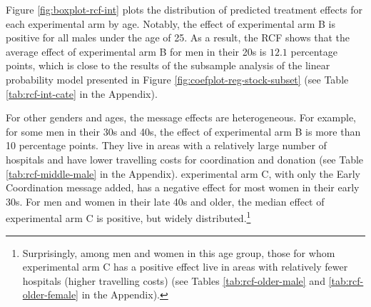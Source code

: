 \documentclass[
]{article}
\begin{document}
Figure \ref{fig:boxplot-rcf-int} plots the distribution of predicted treatment effects for each experimental arm by age. Notably, the effect of experimental arm B is positive for all males under the age of 25. As a result, the RCF shows that the average effect of experimental arm B for men in their 20s is \(12.1\) percentage points, which is close to the results of the subsample analysis of the linear probability model presented in Figure \ref{fig:coefplot-reg-stock-subset} (see Table \ref{tab:rcf-int-cate} in the Appendix).

For other genders and ages, the message effects are heterogeneous. For example, for some men in their 30s and 40s, the effect of experimental arm B is more than 10 percentage points. They live in areas with a relatively large number of hospitals and have lower travelling costs for coordination and donation (see Table \ref{tab:rcf-middle-male} in the Appendix). experimental arm C, with only the Early Coordination message added, has a negative effect for most women in their early 30s. For men and women in their late 40s and older, the median effect of experimental arm C is positive, but widely distributed.\footnote{Surprisingly, among men and women in this age group, those for whom experimental arm C has a positive effect live in areas with relatively fewer hospitals (higher travelling costs) (see Tables \ref{tab:rcf-older-male} and \ref{tab:rcf-older-female} in the Appendix).}
\end{document}
